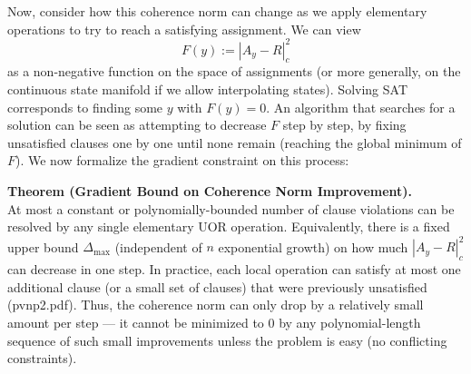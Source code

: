 \documentclass[11pt]{article}
\begin{document}
Now, consider how this coherence norm can change as we apply elementary operations to try to reach a satisfying assignment. We can view 
\[
F(y) := |A_y - R|_c^2
\]
as a non-negative function on the space of assignments (or more generally, on the continuous state manifold if we allow interpolating states). Solving SAT corresponds to finding some \(y\) with \(F(y)=0\). An algorithm that searches for a solution can be seen as attempting to decrease \(F\) step by step, by fixing unsatisfied clauses one by one until none remain (reaching the global minimum of \(F\)). We now formalize the gradient constraint on this process:

\bigskip

\textbf{Theorem (Gradient Bound on Coherence Norm Improvement).} \\
At most a constant or polynomially-bounded number of clause violations can be resolved by any single elementary UOR operation. Equivalently, there is a fixed upper bound \(\Delta_{\max}\) (independent of \(n\) exponential growth) on how much \(|A_y - R|_c^2\) can decrease in one step. In practice, each local operation can satisfy at most one additional clause (or a small set of clauses) that were previously unsatisfied (pvnp2.pdf). Thus, the coherence norm can only drop by a relatively small amount per step --- it cannot be minimized to \(0\) by any polynomial-length sequence of such small improvements unless the problem is easy (no conflicting constraints).

\bigskip
\end{document}
